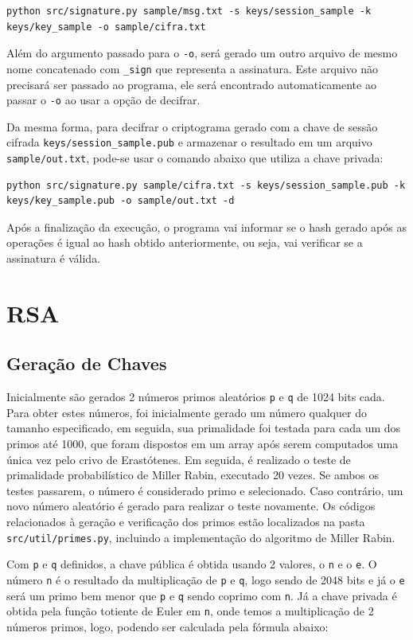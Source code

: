 \documentclass[12pt]{article}
\begin{document}
\begin{lstlisting}
python src/signature.py sample/msg.txt -s keys/session_sample -k keys/key_sample -o sample/cifra.txt
\end{lstlisting}

Além do argumento passado para o \texttt{-o}, será gerado um outro arquivo de mesmo nome concatenado com \texttt{\_sign} que representa a assinatura. Este arquivo não precisará ser passado ao programa, ele será encontrado automaticamente ao passar o \texttt{-o} ao usar a opção de decifrar.

Da mesma forma, para decifrar o criptograma gerado com a chave de sessão cifrada \texttt{keys/session\_sample.pub} e armazenar o resultado em um arquivo \texttt{sample/out.txt}, pode-se usar o comando abaixo que utiliza a chave privada:

\begin{lstlisting}
python src/signature.py sample/cifra.txt -s keys/session_sample.pub -k keys/key_sample.pub -o sample/out.txt -d
\end{lstlisting}

Após a finalização da execução, o programa vai informar se o hash gerado após as operações é igual ao hash obtido anteriormente, ou seja, vai verificar se a assinatura é válida.

\section{RSA}
\subsection{Geração de Chaves}

Inicialmente são gerados 2 números primos aleatórios \texttt{p} e \texttt{q} de 1024 bits cada. Para obter estes números, foi inicialmente gerado um número qualquer do tamanho especificado, em seguida, sua primalidade foi testada para cada um dos primos até 1000, que foram dispostos em um array após serem computados uma única vez pelo crivo de Erastótenes. Em seguida, é realizado o teste de primalidade probabilístico de Miller Rabin, executado 20 vezes. Se ambos os testes passarem, o número é considerado primo e selecionado. Caso contrário, um novo número aleatório é gerado para realizar o teste novamente. Os códigos relacionados à geração e verificação dos primos estão localizados na pasta \texttt{src/util/primes.py}, incluindo a implementação do algoritmo de Miller Rabin.

Com \texttt{p} e \texttt{q} definidos, a chave pública é obtida usando 2 valores, o \texttt{n} e o \texttt{e}. O número \texttt{n} é o resultado da multiplicação de \texttt{p} e \texttt{q}, logo sendo de 2048 bits e já o \texttt{e} será um primo bem menor que \texttt{p} e \texttt{q} sendo coprimo com \texttt{n}. Já a chave privada é obtida pela função totiente de Euler em \texttt{n}, onde temos a multiplicação de 2 números primos, logo, podendo ser calculada pela fórmula abaixo:
\end{document}
